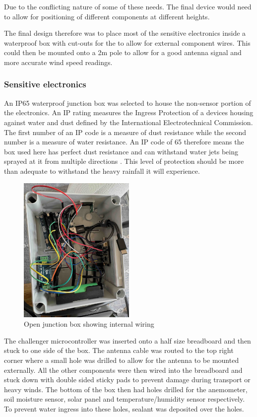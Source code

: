 Due to the conflicting nature of some of these needs. The final device would
need to allow for positioning of different components at different heights.

The final design therefore was to place most of the sensitive electronics inside
a waterproof box with cut-outs for the to allow for external component wires.
This could then be mounted onto a 2m pole to allow for a good antenna signal and
more accurate wind speed readings.

\subsubsection{Sensitive electronics}

An IP65 waterproof junction box was selected to house the non-sensor portion of
the electronics. An IP rating measures the Ingress Protection of a devices
housing against water and dust defined by the International Electrotechnical
Commission. The first number of an IP code is a measure of dust resistance while
the second number is a measure of water resistance. An IP code of 65 therefore
means the box used here has perfect dust resistance and can withstand water jets
being sprayed at it from multiple directions \cite{wiki-ip}. This level of
protection should be more than adequate to withstand the heavy rainfall it will
experience.

\begin{figure}[H]
    \centering
    \includegraphics[width=0.5\textwidth]{contents/part-2/fig2/box-internals.jpeg}
    \caption{Open junction box showing internal wiring}
    \label{fig:box-internals}
\end{figure}

The challenger microcontroller was inserted onto a half size breadboard and then
stuck to one side of the box. The antenna cable was routed to the top right
corner where a small hole was drilled to allow for the antenna to be mounted
externally. All the other components were then wired into the breadboard and
stuck down with double sided sticky pads to prevent damage during transport or
heavy winds. The bottom of the box then had holes drilled for the anemometer,
soil moisture sensor, solar panel and temperature/humidity sensor respectively.
To prevent water ingress into these holes, sealant was deposited over the holes.

